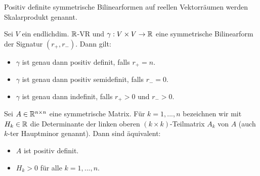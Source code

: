 \documentclass{cheat-sheet}
\begin{document}
\begin{bem}
  Positiv definite symmetrische Bilinearformen auf reellen Vektorräumen werden Skalarprodukt genannt.
\end{bem}

\begin{satz}
  Sei $V$ ein endlichdim. $\mathbb{R}$-VR und $\gamma : V \times V \to \mathbb{R}$ eine symmetrische Bilinearform der Signatur $(r_+, r_-)$. Dann gilt:
  \begin{itemize}
    \item $\gamma$ ist genau dann positiv definit, falls $r_+ = n$.
    \item $\gamma$ ist genau dann positiv semidefinit, falls $r_- = 0$.
    \item $\gamma$ ist genau dann indefinit, falls $r_+ > 0$ und $r_- > 0$.
  \end{itemize}
\end{satz}

\begin{satz}
  Sei $A \in \mathbb{R}^{n \times n}$ eine symmetrische Matrix. Für $k = 1, ..., n$ bezeichnen wir mit $H_k \in \mathbb{R}$ die Determinante der linken oberen $(k \times k)$-Teilmatrix $A_k$ von $A$ (auch $k$-ter Hauptminor genannt). Dann sind äquivalent:
  \begin{itemize}
    \item $A$ ist positiv definit.
    \item $H_k > 0$ für alle $k = 1, ..., n$.
  \end{itemize}
\end{satz}
\end{document}
